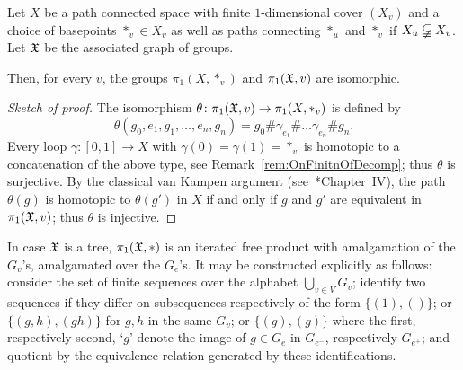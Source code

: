 \documentclass{amsart}
\begin{document}
\begin{thm}\label{thm:vankampen}
  Let $X$ be a path connected space with finite $1$-dimensional cover
  $(X_v)$ and a choice of basepoints $*_v\in X_v$ as well as paths
  connecting $*_{u}$ and $*_{v}$ if $X_{u}\varsubsetneqq X_{v}$. Let
  ${\mathfrak X}$ be the associated graph of groups.

  Then, for every $v$, the groups $\pi_1(X,*_v)$ and $\pi_1({\mathfrak X},v)$
  are isomorphic.
\end{thm}
\begin{proof}[Sketch of proof]
  The isomorphism $\theta\colon\pi_1({\mathfrak X},v)\to\pi_1(X,*_v)$ is defined by
  \[\theta(g_0,e_1,g_1,\dots,e_n,g_n)=g_0\#\gamma_{e_1}\#\dots \gamma_{e_n}\#g_n.\]
  Every loop $\gamma\colon[0,1]\to X$ with $\gamma(0)=\gamma(1)=*_v$ is
  homotopic to a concatenation of the above type, see
  Remark~\ref{rem:OnFinitnOfDecomp}; thus $\theta$ is surjective.  By the
  classical van Kampen argument (see~\cite{massey:at}*{Chapter~IV}), the
  path $\theta(g)$ is homotopic to $\theta(g')$ in $X$ if and only if $g$
  and $g'$ are equivalent in $\pi_1({\mathfrak X},v)$; thus $\theta$ is injective.
\end{proof}

In case ${\mathfrak X}$ is a tree, $\pi_1({\mathfrak X},*)$ is an iterated free product with
amalgamation of the $G_v$'s, amalgamated over the $G_e$'s.  It may be
constructed explicitly as follows: consider the set of finite sequences
over the alphabet $\bigcup_{v\in V}G_v$; identify two sequences if they
differ on subsequences respectively of the form $\{(1),()\}$; or
$\{(g,h),(g h)\}$ for $g,h$ in the same $G_v$; or $\{(g),(g)\}$ where the
first, respectively second, `$g$' denote the image of $g\in G_e$ in
$G_{e^-}$, respectively $G_{e^+}$; and quotient by the equivalence relation
generated by these identifications.
\end{document}
